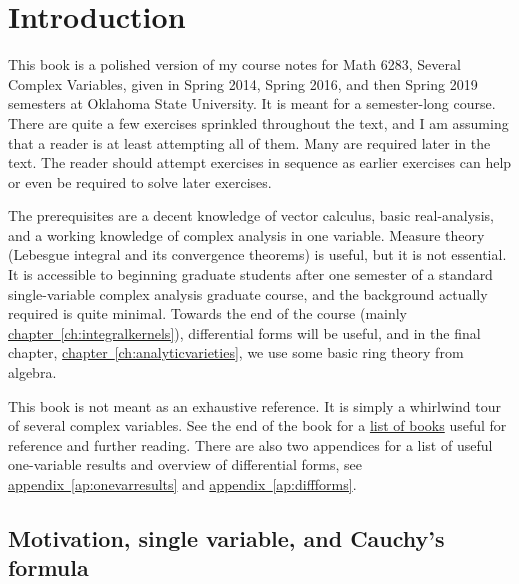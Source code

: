 \documentclass[12pt,openany]{book}
\theoremstyle{plain}
\theoremstyle{remark}
\theoremstyle{definition}
\theoremstyle{exercise}
\theoremstyle{example}
\newcommand{\chapterref}[1]{\hyperref[#1]{chapter~\ref*{#1}}}
\newcommand{\appendixref}[1]{\hyperref[#1]{appendix~\ref*{#1}}}
\begin{document}

\chapter*{Introduction} \label{ch:intro}


This book is a polished version of my course notes for Math 6283, Several
Complex Variables, given in
Spring 2014, Spring 2016, and then Spring 2019 semesters
at Oklahoma State University.
It is meant for a semester-long course.
There are quite a few
exercises sprinkled throughout the text, and I am assuming that a reader is
at least attempting all of them.  Many are required later in the
text.  The reader should attempt exercises in sequence as earlier exercises
can help or even be required to solve later exercises.

The prerequisites are a decent knowledge of vector calculus, basic
real-analysis, and a working knowledge of complex analysis in one variable.
Measure theory (Lebesgue integral and its convergence theorems) is useful,
but it is not essential.
It is accessible to beginning graduate students after one semester
of a standard single-variable complex
analysis graduate course, and the background actually required is quite minimal.
Towards the end of the course (mainly \chapterref{ch:integralkernels}),
differential forms will be useful, and
in the final chapter, \chapterref{ch:analyticvarieties},
we use some basic ring theory from algebra.

This book is not meant as an exhaustive reference.  It is simply a whirlwind
tour of several complex variables.  See the end of the book
for a \hyperref[ch:furtherreading]{list of books} useful for
reference and further reading.  There are also two appendices for
a list of useful one-variable results and overview of differential forms,
see \appendixref{ap:onevarresults} and
\appendixref{ap:diffforms}.


\section{Motivation, single variable, and Cauchy's formula} \label{sec:motivation}
\end{document}

